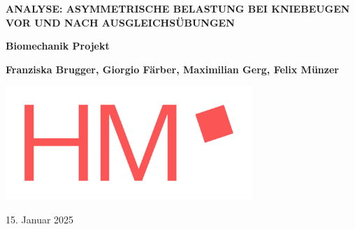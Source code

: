 
\begin{titlepage}
   \begin{center}
       \vspace*{1cm}

       \Huge
       \textbf{
         ANALYSE: ASYMMETRISCHE BELASTUNG BEI KNIEBEUGEN VOR UND NACH AUSGLEICHSÜBUNGEN
       }

       \vspace{0.5cm}
       \LARGE

       \vspace{1.5cm}

       \textbf{Biomechanik Projekt}
       \vfill

       \textbf{Franziska Brugger, Giorgio Färber, Maximilian Gerg, Felix Münzer}
       \vfill

       \begin{center}
         \includegraphics[width=0.7\textwidth]{img/hm-logo.jpg}
         \\
         \normalsize
       \end{center}


       \vfill


       \Large


       \vspace{0.8cm}
       \centering

       15. Januar 2025



   \end{center}
 \end{titlepage}